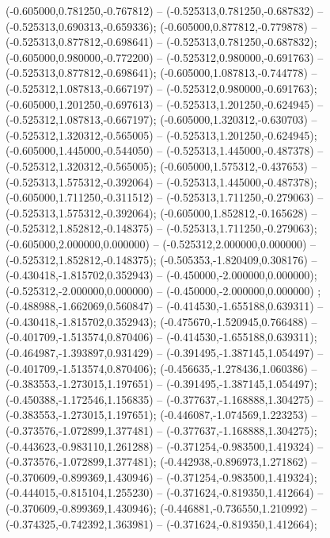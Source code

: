  (-0.605000,0.781250,-0.767812) -- (-0.525313,0.781250,-0.687832) -- (-0.525313,0.690313,-0.659336);
 (-0.605000,0.877812,-0.779878) -- (-0.525313,0.877812,-0.698641) -- (-0.525313,0.781250,-0.687832);
 (-0.605000,0.980000,-0.772200) -- (-0.525312,0.980000,-0.691763) -- (-0.525313,0.877812,-0.698641);
 (-0.605000,1.087813,-0.744778) -- (-0.525312,1.087813,-0.667197) -- (-0.525312,0.980000,-0.691763);
 (-0.605000,1.201250,-0.697613) -- (-0.525313,1.201250,-0.624945) -- (-0.525312,1.087813,-0.667197);
 (-0.605000,1.320312,-0.630703) -- (-0.525312,1.320312,-0.565005) -- (-0.525313,1.201250,-0.624945);
 (-0.605000,1.445000,-0.544050) -- (-0.525313,1.445000,-0.487378) -- (-0.525312,1.320312,-0.565005);
 (-0.605000,1.575312,-0.437653) -- (-0.525313,1.575312,-0.392064) -- (-0.525313,1.445000,-0.487378);
 (-0.605000,1.711250,-0.311512) -- (-0.525313,1.711250,-0.279063) -- (-0.525313,1.575312,-0.392064);
 (-0.605000,1.852812,-0.165628) -- (-0.525312,1.852812,-0.148375) -- (-0.525313,1.711250,-0.279063);
 (-0.605000,2.000000,0.000000) -- (-0.525312,2.000000,0.000000) -- (-0.525312,1.852812,-0.148375);
 (-0.505353,-1.820409,0.308176) -- (-0.430418,-1.815702,0.352943) -- (-0.450000,-2.000000,0.000000);
 (-0.525312,-2.000000,0.000000) -- (-0.450000,-2.000000,0.000000) ;
 (-0.488988,-1.662069,0.560847) -- (-0.414530,-1.655188,0.639311) -- (-0.430418,-1.815702,0.352943);
 (-0.475670,-1.520945,0.766488) -- (-0.401709,-1.513574,0.870406) -- (-0.414530,-1.655188,0.639311);
 (-0.464987,-1.393897,0.931429) -- (-0.391495,-1.387145,1.054497) -- (-0.401709,-1.513574,0.870406);
 (-0.456635,-1.278436,1.060386) -- (-0.383553,-1.273015,1.197651) -- (-0.391495,-1.387145,1.054497);
 (-0.450388,-1.172546,1.156835) -- (-0.377637,-1.168888,1.304275) -- (-0.383553,-1.273015,1.197651);
 (-0.446087,-1.074569,1.223253) -- (-0.373576,-1.072899,1.377481) -- (-0.377637,-1.168888,1.304275);
 (-0.443623,-0.983110,1.261288) -- (-0.371254,-0.983500,1.419324) -- (-0.373576,-1.072899,1.377481);
 (-0.442938,-0.896973,1.271862) -- (-0.370609,-0.899369,1.430946) -- (-0.371254,-0.983500,1.419324);
 (-0.444015,-0.815104,1.255230) -- (-0.371624,-0.819350,1.412664) -- (-0.370609,-0.899369,1.430946);
 (-0.446881,-0.736550,1.210992) -- (-0.374325,-0.742392,1.363981) -- (-0.371624,-0.819350,1.412664);
